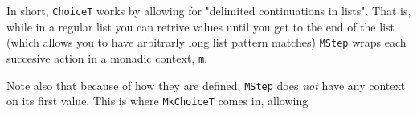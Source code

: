 In short, \verb|ChoiceT| works by allowing for "delimited continuations in lists".
That is, while in a regular list you can retrive values until you get to the end of the list (which allows you to have arbitrarly long list pattern matches) \verb|MStep| wraps each succesive action in a monadic context, \verb|m|.

Note also that because of how they are defined, \verb|MStep| does \emph{not} have any context on its first value.
This is where \verb|MkChoiceT| comes in, allowing 